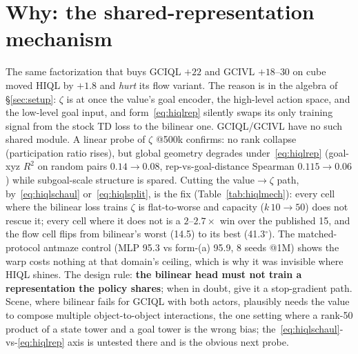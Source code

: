 \documentclass[11pt]{article}
\newcommand{\B}[1]{\textbf{#1}}
\newcommand{\loc}[1]{\textcolor{locgreen}{#1}}
\newcommand{\pub}[1]{\textcolor{puborange}{#1}}
\newcommand{\nr}{\textcolor{gray}{\emph{not run}}}
\begin{document}
\begin{table}[h]
\caption{\B{Does bilinear factorization beat SOTA?} State obs;
\texttt{evaluation/overall\_success} (\%) over 5 eval goals, mean\,$\pm$\,SD,
$n{=}3$ seeds @500k unless noted. \loc{Green}=local, \pub{orange}=OGBench
paper (8 seeds @1M); \B{bold green} = beats the published number for that
method/domain. $^{m}$matched protocol: 8 seeds, 1M, avg last-3 evals.
$^{\circ}$read @400k, runs finishing. $^{\alpha}$$\alpha{=}0.3$ vs stock
$\alpha{=}1.0$ (confounded, rerun owed). $^{s}$$n{=}2$ (third seed @300k:
20.8). $^\dagger$healthy batch; an earlier batch died at init and had
contaminated this cell as ``$47.5\pm38.8$''. HIQL cube cells use the tuned
\texttt{subgoal\_steps}${=}10$. \nr\ = not run.}
\label{tab:main}
\end{table}

\section{Why: the shared-representation mechanism}
\label{sec:hiqlmech}
The same factorization that buys GCIQL $+22$ and GCIVL $+18$--$30$ on cube moved
HIQL by $+1.8$ and \emph{hurt} its flow variant. The reason is in the algebra of
\S\ref{sec:setup}: $\zeta$ is at once the value's goal encoder, the high-level
action space, and the low-level goal input, and form~\eqref{eq:hiqlrep}
silently swaps its only training signal from the stock TD loss to the bilinear
one. GCIQL/GCIVL have no such shared module. A linear probe of $\zeta$ @500k
confirms: no rank collapse (participation ratio rises), but global geometry
degrades under~\eqref{eq:hiqlrep} (goal-xyz $R^2$ on random pairs
$0.14\!\to\!0.08$, rep-vs-goal-distance Spearman $0.115\!\to\!0.06$) while
subgoal-scale structure is spared. Cutting the value$\to\zeta$ path,
by~\eqref{eq:hiqlschaul} or~\eqref{eq:hiqlsplit}, is the fix
(Table~\ref{tab:hiqlmech}): every cell where the bilinear loss trains $\zeta$ is
flat-to-worse and capacity ($k\,10\!\to\!50$) does not rescue it; every cell
where it does not is a $2$--$2.7\times$ win over the published \pub{15}, and the
flow cell flips from bilinear's worst (14.5) to its best (41.3$^{\circ}$). The
matched-protocol antmaze control (MLP \loc{95.3} vs form-(a) \loc{95.9}, 8
seeds @1M) shows the warp costs nothing at that domain's ceiling, which is why
it was invisible where HIQL shines. The design rule: \B{the bilinear head must
not train a representation the policy shares}; when in doubt, give it a
stop-gradient path. Scene, where bilinear fails for GCIQL with both actors,
plausibly needs the value to compose multiple object-to-object interactions,
the one setting where a rank-50 product of a state tower and a goal tower is the
wrong bias; the~\eqref{eq:hiqlschaul}-vs-\eqref{eq:hiqlrep} axis is untested
there and is the obvious next probe.
\end{document}
